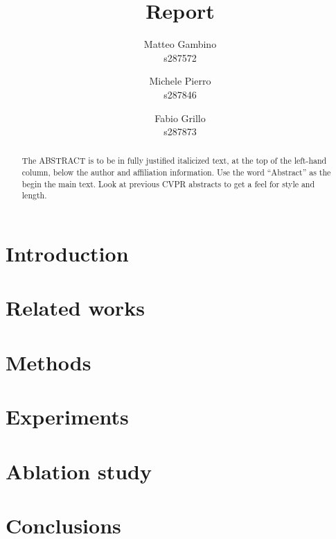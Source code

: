 \documentclass[10pt,twocolumn,letterpaper]{article}
\begin{document}
\title{Report}

\author{Matteo Gambino\\
s287572
\and
Michele Pierro\\
s287846
\and
Fabio Grillo\\
s287873
}
\maketitle

\begin{abstract}
   The ABSTRACT is to be in fully justified italicized text, at the top of the left-hand column, below the author and affiliation information.
   Use the word ``Abstract'' as the begin the main text.
   Look at previous CVPR abstracts to get a feel for style and length.
\end{abstract}

\section{Introduction}

\section{Related works}
\section{Methods}
\section{Experiments}
\section{Ablation study}
\section{Conclusions}

{\small


}
\end{document}
